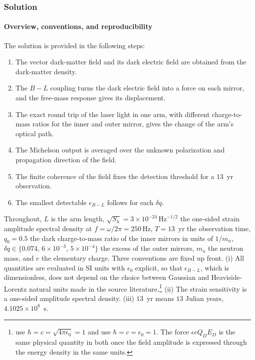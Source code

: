 \providecommand{\citep}[2][]{\cite{#2}}
\providecommand{\citet}[2][]{\cite{#2}}
\providecommand{\citealt}[2][]{\cite{#2}}
\providecommand{\nat}{Nature}
\providecommand{\prl}{Physical Review Letters}
\providecommand{\prd}{Physical Review D}
\providecommand{\pra}{Physical Review A}

\subsubsection*{Solution}

\paragraph*{Overview, conventions, and reproducibility}
The solution is provided in the following steps:
%
\begin{enumerate}[label=Step~\arabic*:,leftmargin=*,align=left,labelsep=0.5em,parsep=0pt,itemsep=0.1em,topsep=0.2em]
    \item The vector dark-matter field and its dark electric field are obtained from the dark-matter density.
    \item The $B-L$ coupling turns the dark electric field into a force on each mirror, and the free-mass response gives its displacement.
    \item The exact round trip of the laser light in one arm, with different charge-to-mass ratios for the inner and outer mirror, gives the change of the arm's optical path.
    \item The Michelson output is averaged over the unknown polarization and propagation direction of the field.
    \item The finite coherence of the field fixes the detection threshold for a $13$~yr observation.
    \item The smallest detectable $\epsilon_{B-L}$ follows for each $\delta q$.
\end{enumerate}
%
Throughout, $L$ is the arm length, $\sqrt{S_h}=3\times10^{-24}\,\mathrm{Hz}^{-1/2}$ the one-sided strain amplitude spectral density at $f=\omega/2\pi=250\,\mathrm{Hz}$, $T=13$~yr the observation time, $q_0=0.5$ the dark charge-to-mass ratio of the inner mirrors in units of $1/m_n$, $\delta q\in\{0.074,\,6\times10^{-3},\,5\times10^{-4}\}$ the excess of the outer mirrors, $m_n$ the neutron mass, and $e$ the elementary charge. Three conventions are fixed up front. (i) All quantities are evaluated in SI units with $\epsilon_0$ explicit, so that $\epsilon_{B-L}$, which is dimensionless, does not depend on the choice between Gaussian and Heaviside-Lorentz natural units made in the source literature.\footnote{\citet{Pierce2018} use $\hbar=c=\sqrt{4\pi\epsilon_0}=1$ and \citet{Morisaki2021} use $\hbar=c=\epsilon_0=1$. The force $\epsilon eQ_DE_D$ is the same physical quantity in both once the field amplitude is expressed through the energy density in the same units.} (ii) The strain sensitivity is a one-sided amplitude spectral density. (iii) $13$~yr means $13$ Julian years, $4.1025\times10^{8}$~s.

